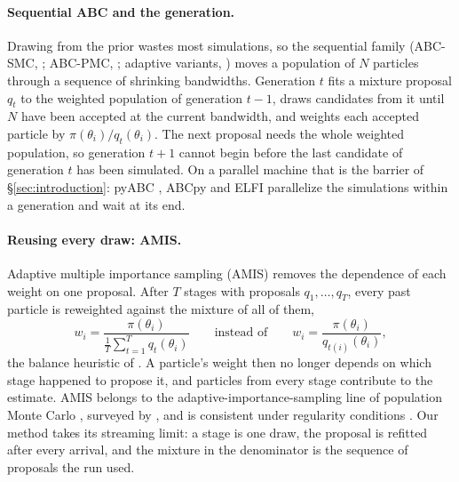 \documentclass[10pt]{article}
\theoremstyle{plain}
\theoremstyle{definition}
\begin{document}
\paragraph{Sequential ABC and the generation.} Drawing from the prior wastes most simulations, so the sequential family (ABC-SMC, \citealp{sisson2007,toni2009abcsmc}; ABC-PMC, \citealp{beaumont2009adaptive}; adaptive variants, \citealp{delmoral2012adaptive,drovandi2011,lenormand2013apmc}) moves a population of $N$ particles through a sequence of shrinking bandwidths. Generation $t$ fits a mixture proposal $q_t$ to the weighted population of generation $t-1$, draws candidates from it until $N$ have been accepted at the current bandwidth, and weights each accepted particle by $\pi(\theta_i)/q_t(\theta_i)$. The next proposal needs the whole weighted population, so generation $t+1$ cannot begin before the last candidate of generation $t$ has been simulated. On a parallel machine that is the barrier of \S\ref{sec:introduction}: pyABC \citep{klinger2018pyabc,schalte2022pyabc}, ABCpy \citep{dutta2017abcpy} and ELFI \citep{lintusaari2018elfi} parallelize the simulations within a generation and wait at its end.

\paragraph{Reusing every draw: AMIS.} Adaptive multiple importance sampling (AMIS) \citep{cornuet2012amis} removes the dependence of each weight on one proposal. After $T$ stages with proposals $q_1,\dots,q_T$, every past particle is reweighted against the mixture of all of them,
\begin{equation}
w_i = \frac{\pi(\theta_i)}{\frac1T\sum_{t=1}^{T} q_t(\theta_i)}
\qquad\text{instead of}\qquad
w_i = \frac{\pi(\theta_i)}{q_{t(i)}(\theta_i)},
\label{eq:balance-heuristic}
\end{equation}
the balance heuristic of \citet{veach1995}. A particle's weight then no longer depends on which stage happened to propose it, and particles from every stage contribute to the estimate. AMIS belongs to the adaptive-importance-sampling line of population Monte Carlo \citep{cappe2004pmc}, surveyed by \citet{bugallo2017ais}, and is consistent under regularity conditions \citep{marin2019consistency}. Our method takes its streaming limit: a stage is one draw, the proposal is refitted after every arrival, and the mixture in the denominator is the sequence of proposals the run used.
\end{document}
